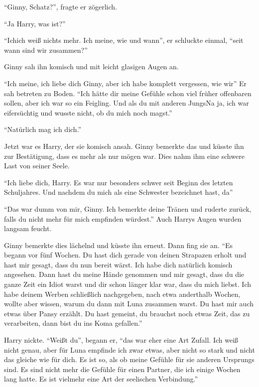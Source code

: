 \enquote{Ginny, Schatz?}, fragte er zögerlich.

\enquote{Ja Harry, was ist?}

\enquote{Ich\abs ich weiß nichts mehr. Ich meine, wie und wann\abs}, er schluckte einmal, \enquote{seit wann sind wir zusammen?}

Ginny sah ihn komisch und mit leicht glasigen Augen an.

\enquote{Ich meine, ich liebe dich Ginny, aber ich habe komplett vergessen, wie wir\abs} Er sah betreten zu Boden. \enquote{Ich hätte dir meine Gefühle schon viel früher offenbaren sollen, aber ich war so ein Feigling. Und als du mit anderen Jungs\abs Na ja, ich war eifersüchtig und wusste nicht, ob du mich noch magst.}

\enquote{Natürlich mag ich dich.}

Jetzt war es Harry, der sie komisch ansah. Ginny bemerkte das und küsste ihn zur Bestätigung, dass es mehr als nur mögen war. Dies nahm ihm eine schwere Last von seiner Seele.

\enquote{Ich liebe dich, Harry. Es war nur besonders schwer seit Beginn des letzten Schuljahres. Und nachdem du mich als eine Schwester bezeichnet hast, da\abs}

\enquote{Das war dumm von mir, Ginny. Ich bemerkte deine Tränen und ruderte zurück, falls du nicht mehr für mich empfinden würdest.} Auch Harrys Augen wurden langsam feucht.

Ginny bemerkte dies lächelnd und küsste ihn erneut. Dann fing sie an. \enquote{Es begann vor fünf Wochen. Du hast dich gerade von deinen Strapazen erholt und hast mir gesagt, dass du nun bereit wärst. Ich habe dich natürlich komisch angesehen. Dann hast du meine Hände genommen und mir gesagt, dass du die ganze Zeit ein Idiot warst und dir schon länger klar war, dass du mich liebst. Ich habe deinem Werben schließlich nachgegeben, nach etwa anderthalb Wochen, wollte aber wissen, warum du dann mit Luna zusammen warst. Du hast mir auch etwas über Pansy erzählt. Du hast gemeint, du brauchst noch etwas Zeit, das zu verarbeiten, dann bist du ins Koma gefallen.}

Harry nickte. \enquote{Weißt du}, begann er, \enquote{das war eher eine Art Zufall. Ich weiß nicht genau, aber für Luna empfinde ich zwar etwas, aber nicht so stark und nicht das gleiche wie für dich. Es ist so, als ob meine Gefühle für sie anderen Ursprungs sind. Es sind nicht mehr die Gefühle für einen Partner, die ich einige Wochen lang hatte. Es ist vielmehr eine Art der seelischen Verbindung.}

